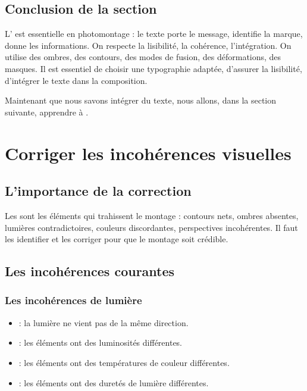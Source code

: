 \subsection*{Conclusion de la section}

L' est essentielle en photomontage : le texte porte le message, identifie la marque, donne les informations. On respecte la lisibilité, la cohérence, l'intégration. On utilise des ombres, des contours, des modes de fusion, des déformations, des masques. Il est essentiel de choisir une typographie adaptée, d'assurer la lisibilité, d'intégrer le texte dans la composition.

Maintenant que nous savons intégrer du texte, nous allons, dans la section suivante, apprendre à .

\section{Corriger les incohérences visuelles}

\subsection{L'importance de la correction}

Les  sont les éléments qui trahissent le montage : contours nets, ombres absentes, lumières contradictoires, couleurs discordantes, perspectives incohérentes. Il faut les identifier et les corriger pour que le montage soit crédible.

\subsection{Les incohérences courantes}

\subsubsection{Les incohérences de lumière}

\begin{itemize}
    \item {} : la lumière ne vient pas de la même direction.
    \item {} : les éléments ont des luminosités différentes.
    \item {} : les éléments ont des températures de couleur différentes.
    \item {} : les éléments ont des duretés de lumière différentes.
\end{itemize}

